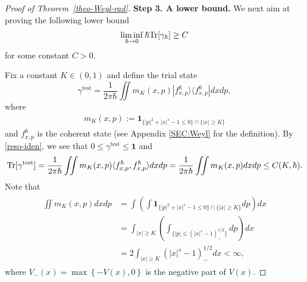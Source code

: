 \documentclass[%
11pt,  reqno]{amsart}
\theoremstyle{remarkstyle}
\newcommand{\1}{\hspace{0.2mm}\text{I}\hspace{0.2mm}}
\newcommand{\jb}[1]
{\langle #1 \rangle}
\newcommand{\ind}{\mathbf 1}
\DeclareMathOperator*{\test}{test}
\numberwithin{equation}{section}
\numberwithin{theorem}{section}
\begin{document}
\begin{proof}[Proof of Theorem~\ref{theo-Weyl-rad}]
		{\bf Step 3. A lower bound.} We next aim at proving the following lower bound
		\begin{align} \label{lowe-boun-trace}
			\liminf_{\hbar \to 0} \hbar {\rm Tr}[\gamma_{\hbar}] \geq C
		\end{align}
		for some constant $C>0$. 
		
		Fix a constant $K\in (0,1)$ and define the trial state
		\[
		\gamma^{\test} =\frac{1}{2\pi \hbar} \iint m_{K}(x,p) |f^\hbar_{x,p}\rangle \langle f^\hbar_{x,p}| dxdp,
		\]
		where
		\begin{align}\label{m0-test}
			m_{K}(x,p):=\ind_{\{|p|^2 + |x|^s-1\leq 0\} \cap \{|x|\geq K\}}
		\end{align}
		and $f^\hbar_{x,p}$ is the coherent state (see Appendix \ref{SEC:Weyl} for the definition). By \eqref{reso-iden}, we see that $0\leq \gamma^{\test} \leq \ind$ and 
		\[
		{\rm Tr}[\gamma^{\test}] = \frac{1}{2\pi\hbar} \iint m_{K}(x,p) \jb{f^{\hbar}_{x,p}, f^{\hbar}_{x,p}} dxdp = \frac{1}{2\pi \hbar} \iint m_{K}(x,p)dxdp \leq C(K,\hbar).
		\]
		Note that
		\begin{align}\label{inte-m0}
			\begin{aligned}
				\iint m_{K}(x,p) dxdp &= \int \left(\int \ind_{\{|p|^2 + |x|^s-1\leq 0\} \cap \{|x|\geq K\}}dp\right) dx \\
				&= \int_{|x|\geq K} \left(\int_{\{|p|\leq (|x|^s-1)_-^{1/2}\}} dp\right) dx\\
				&= 2\int_{|x|\geq K} (|x|^s-1)_-^{1/2} dx <\infty,
			\end{aligned}
		\end{align}
		where $V_-(x) = \max \left\{-V(x),0\right\}$ is the negative part of $V(x)$. 
		

\end{proof}
\end{document}
